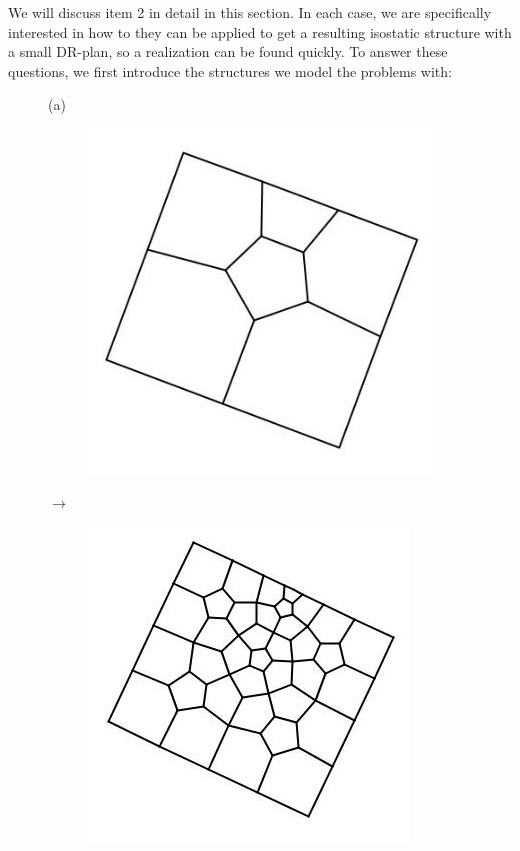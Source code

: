 We will discuss item 2 in detail in this section. In each case, we are specifically interested in how to they can be applied to get a resulting isostatic structure with a small DR-plan, so a realization can be found quickly. To answer these questions, we first introduce the structures we model the problems with:

\begin{figure}\centering
    (a)
    \begin{subfigure}{0.2\linewidth}
        \includegraphics[width=\linewidth]{img/pentl1}
    \end{subfigure}
    $\rightarrow$
    \begin{subfigure}{0.2\linewidth}
        \includegraphics[width=\linewidth]{img/pentl2}
    \end{subfigure}


\end{figure}
